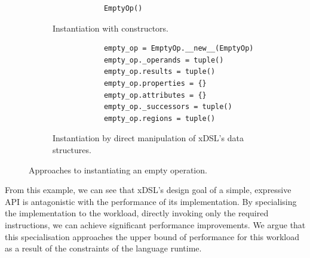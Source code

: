 \begin{figure}[H]
    \begin{subfigure}[b]{0.5\textwidth}
       \centering
        \begin{verbatim}
            EmptyOp()
        \end{verbatim}
        \footnotesize\vspace{3em}
        \caption{Instantiation with constructors.}
        \label{listing:ubenchmark-xdsl-constant-constructor}
    \end{subfigure}
    \hfill
    \begin{subfigure}[b]{0.5\textwidth}
        \centering
        \begin{verbatim}
            empty_op = EmptyOp.__new__(EmptyOp)
            empty_op._operands = tuple()
            empty_op.results = tuple()
            empty_op.properties = {}
            empty_op.attributes = {}
            empty_op._successors = tuple()
            empty_op.regions = tuple()
        \end{verbatim}
        \caption{Instantiation by direct manipulation of xDSL's data structures.}
        \label{listing:ubenchmark-xdsl-constant-direct}
    \end{subfigure}
    \captionsetup{name=Listing}
    \caption{Approaches to instantiating an empty operation.}
    \label{listing:ubenchmark-xdsl-constant}
\end{figure}

From this example, we can see that xDSL's design goal of a simple, expressive API is antagonistic with the performance of its implementation. By specialising the implementation to the workload, directly invoking only the required instructions, we can achieve significant performance improvements. We argue that this specialisation approaches the upper bound of performance for this workload as a result of the constraints of the language runtime.

